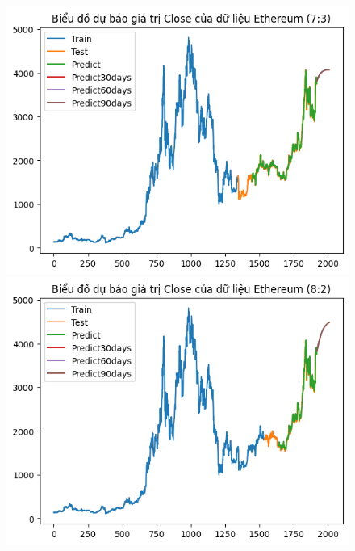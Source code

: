 \documentclass[conference]{IEEEtran}
\begin{document}
	\begin{figure}[H]
		\centering
		\begin{minipage}{0.15\textwidth}
			\centering
			\includegraphics[width=1\textwidth]{Figure/GRU_ETH_73.png}
		\end{minipage}
		\hfill
		\begin{minipage}{0.15\textwidth}
			\centering
			\includegraphics[width=1\textwidth]{Figure/GRU_ETH_82.png}
		\end{minipage}
		\hfill
		\begin{minipage}{0.15\textwidth}
			\centering

\end{minipage}
\end{figure}
\end{document}
